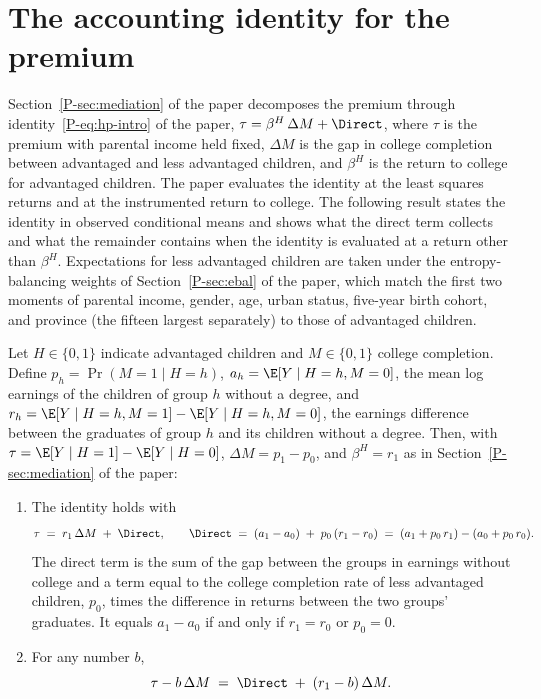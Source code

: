 \section{The accounting identity for the premium}
\label{fr:sec:identity}

Section~\ref{P-sec:mediation} of the paper decomposes the premium through identity~\eqref{P-eq:hp-intro} of the paper, $\tau = \beta^{H}\,\Delta M + \Direct$, where $\tau$ is the premium with parental income held fixed, $\Delta M$ is the gap in college completion between advantaged and less advantaged children, and $\beta^{H}$ is the return to college for advantaged children. The paper evaluates the identity at the least squares returns and at the instrumented return to college. The following result states the identity in observed conditional means and shows what the direct term collects and what the remainder contains when the identity is evaluated at a return other than $\beta^{H}$.
Expectations for less advantaged children are taken under the entropy-balancing
weights of Section~\ref{P-sec:ebal} of the paper, which match the first
two moments of parental income, gender, age, urban status, five-year birth cohort, and province (the fifteen largest separately) to those of advantaged children.

\begin{proposition}
\label{fr:prop:identity}
Let $H \in \{0,1\}$ indicate advantaged children and $M \in \{0,1\}$ college
completion. Define $p_h = \Pr(M = 1 \mid H = h)$,
$a_h = \E[Y \mid H = h, M = 0]$, the mean log earnings of the children of
group $h$ without a degree, and
$r_h = \E[Y \mid H = h, M = 1] - \E[Y \mid H = h, M = 0]$, the earnings
difference between the graduates of group $h$ and its children without a
degree. Then, with $\tau = \E[Y \mid H = 1] - \E[Y \mid H = 0]$,
$\Delta M = p_1 - p_0$, and $\beta^{H} = r_1$ as in
Section~\ref{P-sec:mediation} of the paper:
\begin{enumerate}
\item[(i)] The identity holds with
\begin{equation}
\tau \;=\; r_1\,\Delta M \;+\; \Direct, \qquad
\Direct \;=\; (a_1 - a_0) \;+\; p_0\,(r_1 - r_0)
\;=\; (a_1 + p_0\,r_1) - (a_0 + p_0\,r_0) .
\label{fr:eq:identity}
\end{equation}
The direct term is the sum of the gap between the groups in earnings
without college and a term equal to the college completion rate of less advantaged children, $p_0$, times the difference in returns between the two groups' graduates. It equals $a_1 - a_0$ if and only if $r_1 = r_0$ or
$p_0 = 0$.
\item[(ii)] For any number $b$,
\begin{equation}
\tau - b\,\Delta M \;=\; \Direct \;+\; (r_1 - b)\,\Delta M .
\label{fr:eq:remainder}
\end{equation}
\end{enumerate}
\end{proposition}

